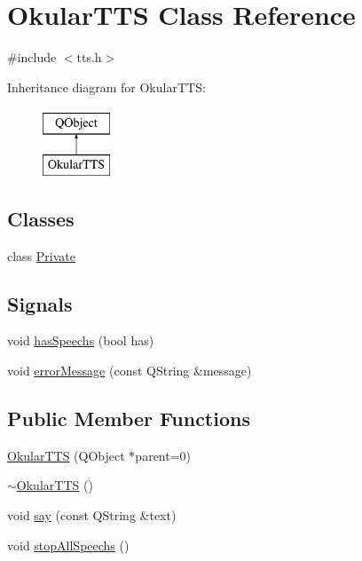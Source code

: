 \hypertarget{classOkularTTS}{\section{Okular\+T\+T\+S Class Reference}
\label{classOkularTTS}
}


{\ttfamily \#include $<$tts.\+h$>$}

Inheritance diagram for Okular\+T\+T\+S\+:\begin{figure}[H]
\begin{center}
\leavevmode
\includegraphics[height=2.000000cm]{classOkularTTS}
\end{center}
\end{figure}
\subsection*{Classes}
\begin{DoxyCompactItemize}
\item 
class \hyperlink{classOkularTTS_1_1Private}{Private}
\end{DoxyCompactItemize}
\subsection*{Signals}
\begin{DoxyCompactItemize}
\item 
void \hyperlink{classOkularTTS_a8ad0df91b054eb5748e4ea6cf14ef415}{has\+Speechs} (bool has)
\item 
void \hyperlink{classOkularTTS_a27379199010d731e732a71dbde72635f}{error\+Message} (const Q\+String \&message)
\end{DoxyCompactItemize}
\subsection*{Public Member Functions}
\begin{DoxyCompactItemize}
\item 
\hyperlink{classOkularTTS_a31441bcfcd71fd38bc37d0c15beb820b}{Okular\+T\+T\+S} (Q\+Object $\ast$parent=0)
\item 
\hyperlink{classOkularTTS_a970c775629e26701c3972e813c8be482}{$\sim$\+Okular\+T\+T\+S} ()
\item 
void \hyperlink{classOkularTTS_a2dc39591e328570027884f725c20ac7a}{say} (const Q\+String \&text)
\item 
void \hyperlink{classOkularTTS_ae8aa81e12a20adf6c356dbf0b3515f87}{stop\+All\+Speechs} ()
\end{DoxyCompactItemize}


